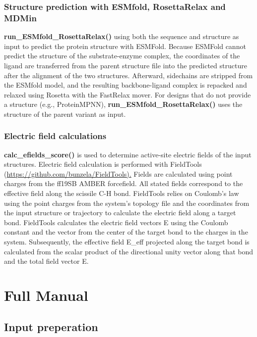\documentclass[10pt]{extarticle}
\let\oldsection\section
\renewcommand{\section}[1]{\clearpage\oldsection{#1}}
\begin{document}
\subsubsection{Structure prediction with ESMfold, RosettaRelax and MDMin}

\textbf{run\_ESMfold\_RosettaRelax()} using both the sequence and structure as input to predict the protein structure with ESMFold. Because ESMFold cannot predict the structure of the substrate-enzyme complex, the coordinates of the ligand are transferred from the parent structure file into the predicted structure after the alignment of the two structures. Afterward, sidechains are stripped from the ESMfold model, and the resulting backbone-ligand complex is repacked and relaxed using Rosetta with the FastRelax mover. For designs that do not provide a structure (e.g., ProteinMPNN), \textbf{run\_ESMfold\_RosettaRelax()} uses the structure of the parent variant as input.

\subsubsection{Electric field calculations}

\textbf{calc\_efields\_score()} is used to determine active-site electric fields of the input structures. Electric field calculation is performed with FieldTools (\href{https://github.com/bunzela/FieldTools).}{https://github.com/bunzela/FieldTools).} Fields are calculated using point charges from the ff19SB AMBER forcefield. All stated fields correspond to the effective field along the scissile C-H bond. FieldTools relies on Coulomb's law using the point charges from the system's topology file and the coordinates from the input structure or trajectory to calculate the electric field along a target bond. FieldTools calculates the electric field vectors E using the Coulomb constant and the vector from the center of the target bond to the charges in the system. Subsequently, the effective field E\_eff projected along the target bond is calculated from the scalar product of the directional unity vector along that bond and the total field vector E.\section{Full Manual}

\subsection{Input preperation}
\end{document}
